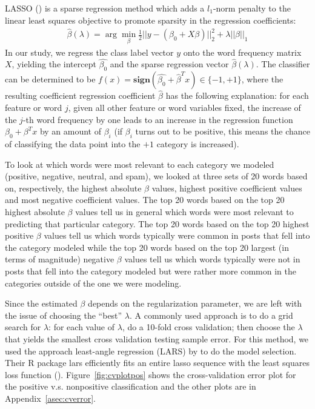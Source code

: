 \documentclass[11pt]{article}
\newcommand{\1}[1]{{\mathbf 1}\left\{#1\right\}}        %
\begin{document}
LASSO (\cite{tibshirani1996regression}) is a sparse regression method which adds a $l_1$-norm penalty to the linear least squares objective to promote sparsity in the regression coefficients:
\begin{align*}
\hat{\beta}(\lambda) = \arg \min_\beta \frac{1}{2}||y-(\beta_0+X\beta)||_2^2 + \lambda ||\beta||_1
\end{align*}
In our study, we regress the class label vector $y$ onto the word frequency matrix $X$, yielding the intercept $\hat{\beta_0}$ and the sparse regression vector $\hat{\beta}(\lambda)$. The classifier can be determined to be $f(x) = \textbf{sign}(\hat{\beta_0}+\hat{\beta}^Tx)\in\{-1,+1\}$, where the resulting coefficient regression coefficient $\hat{\beta}$ has the following explanation: for each feature or word $j$, given all other feature or word variables fixed, the increase of the $j$-th word frequency by one leads to an increase in the regression function $\beta_0+\beta^Tx$ by an amount of $\beta_i$ (if $\beta_i$ turns out to be positive, this means the chance of classifying the data point into the $+1$ category is increased).

To look at which words were most relevant to each category we modeled (positive, negative, neutral, and spam), we looked at three sets of 20 words based on, respectively, the highest absolute $\beta$ values, highest positive coefficient values and most negative coefficient values. The top 20 words based on the top 20 highest absolute $\beta$ values tell us in general which words were most relevant to predicting that particular category.  The top 20 words based on the top 20 highest positive $\beta$ values tell us which words typically were common in posts that fell into the category modeled while the top 20 words based on the top 20 largest (in terms of magnitude) negative $\beta$ values tell us which words typically were not in posts that fell into the category modeled but were rather more common in the categories outside of the one we were modeling.

Since the estimated $\beta$ depends on the regularization parameter, we are left with the issue of choosing the ``best'' $\lambda$. A commonly used approach is to do a grid search for $\lambda$: for each value of $\lambda$, do a 10-fold cross validation; then choose the $\lambda$ that yields the smallest cross validation testing sample error. For this method, we used the approach least-angle regression (LARS) by \cite{efron2004least} to do the model selection. Their {\sffamily R} package {\sffamily lars} efficiently fits an entire lasso sequence with the least squares loss function (\cite{Rlars}). Figure~\ref{fig:cvplotpos} shows the cross-validation error plot for the positive v.s. nonpositive classification and the other plots are in Appendix~\ref{asec:cverror}.
\end{document}
